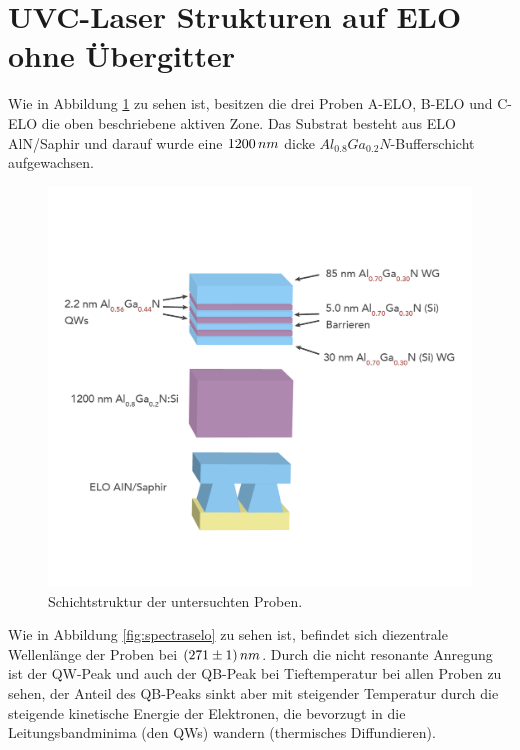 \section{UVC-Laser Strukturen auf ELO ohne Übergitter}
Wie in Abbildung \ref{fig:schichtenelo1} zu sehen ist, besitzen die drei Proben A-ELO, B-ELO und C-ELO die oben beschriebene aktiven Zone. Das Substrat besteht aus ELO AlN/Saphir und darauf wurde eine $1200 \thinspace nm$ dicke $ Al_{0.8}Ga_{0.2}N$-Bufferschicht aufgewachsen. 
\begin{figure}[H]
\includegraphics[width=\linewidth]{Bilder/TS4045/ts4045.png}
\caption{Schichtstruktur der untersuchten Proben.}
\label{fig:schichtenelo1}
\end{figure}
\noindent 
Wie in Abbildung \ref{fig:spectraselo} zu sehen ist, befindet sich diezentrale Wellenlänge der Proben bei $(271 \pm 1) \thinspace nm$. Durch die nicht resonante Anregung ist der QW-Peak und auch der QB-Peak bei Tieftemperatur bei allen Proben zu sehen, der Anteil des QB-Peaks sinkt aber mit steigender Temperatur durch die steigende kinetische Energie der Elektronen, die bevorzugt in die Leitungsbandminima (den QWs) wandern (thermisches Diffundieren).
